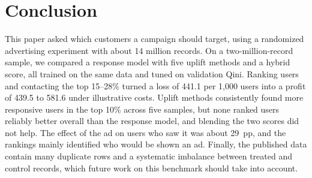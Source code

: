 \documentclass[conference]{IEEEtran}
\begin{document}
\section{Conclusion}

This paper asked which customers a campaign should target, using a
randomized advertising experiment with about 14 million records. On a
two-million-record sample, we compared a response model with five uplift
methods and a hybrid score, all trained on the same data and tuned on
validation Qini. Ranking users and contacting the top 15--28\% turned a
loss of 441.1 per 1,000 users into a profit of 439.5 to 581.6 under
illustrative costs. Uplift methods consistently found more responsive
users in the top 10\% across five samples, but none ranked users
reliably better overall than the response model, and blending the two
scores did not help. The effect of the ad on users who saw it was about
29~pp, and the rankings mainly identified who would be shown an ad.
Finally, the published data contain many duplicate rows and a
systematic imbalance between treated and control records, which future
work on this benchmark should take into account.
\end{document}

